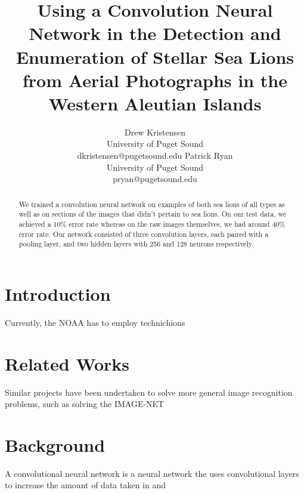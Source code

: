 \documentclass[letterpaper]{article}
\begin{document}
%
\title{Using a Convolution Neural Network in the Detection and Enumeration of Stellar Sea Lions from Aerial Photographs in the Western Aleutian Islands}
\author{
Drew Kristensen \\
University of Puget Sound\\
dkristensen@pugetsound.edu 
\And
Patrick Ryan\\
University of Puget Sound\\
pryan@pugetsound.edu
} 

\maketitle
\begin{abstract}
We trained a convolution neural network on examples of both sea lions of all types as well as on sections of the images that didn't pertain to sea lions. On our test data, we achieved a 10\% error rate whereas on the raw images themselves, we had around 40\% error rate. Our network consisted of three convolution layers, each paired with a pooling layer, and two hidden layers with 256 and 128 neurons respectively.
\end{abstract}

\section{Introduction}
Currently, the NOAA has to employ technichions 

\section{Related Works}
Similar projects have been undertaken to solve more general image recognition problems, such as solving the IMAGE-NET 

\section{Background}
A convolutional neural network is a neural network the uses convolutional layers to increase the amount of data taken in and 

\end{document}
